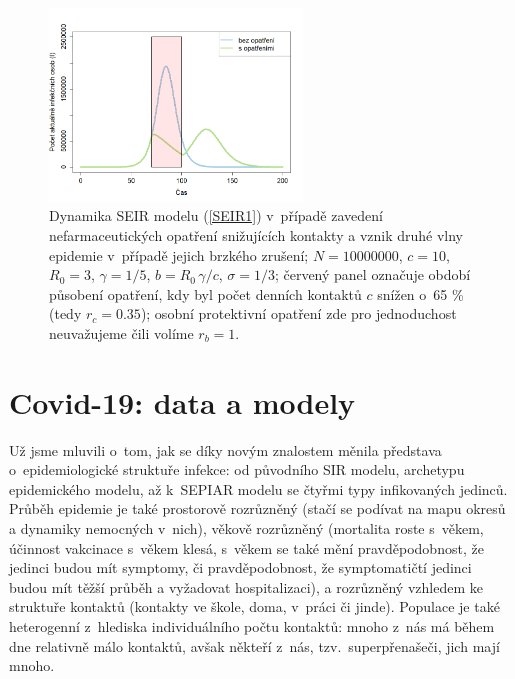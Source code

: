 \begin{figure}[ht]
	\begin{center}
			\includegraphics[width=0.6\textwidth]{pic/two_waves.png}
	\end{center}
	\caption{Dynamika SEIR modelu (\ref{SEIR1}) v~případě zavedení nefarmaceutických opatření snižujících kontakty a vznik druhé vlny epidemie v~případě jejich brzkého zrušení; $N=10000000$, $c=10$, $R_0=3$, $\gamma=1/5$, $b=R_0\,\gamma/c$, $\sigma=1/3$; červený panel označuje období působení opatření, kdy byl počet denních kontaktů $c$ snížen o~65 \% (tedy $r_c=0.35$); osobní protektivní opatření zde pro jednoduchost neuvažujeme čili volíme $r_b=1$. %
	}
	\label{SEIR-vlna}
\end{figure}

\section*{Covid-19: data a modely}

Už jsme mluvili o~tom, jak se díky novým znalostem měnila představa o~epidemiologické struktuře infekce: od původního SIR modelu, archetypu epidemického modelu, až k~SEPIAR modelu se čtyřmi typy infikovaných jedinců. Průběh epidemie je také prostorově rozrůzněný (stačí se podívat na mapu okresů a dynamiky nemocných v~nich), věkově rozrůzněný (mortalita roste s~věkem, účinnost vakcinace s~věkem klesá, s~věkem se také mění pravděpodobnost, že jedinci budou mít symptomy, či pravděpodobnost, že symptomatičtí jedinci budou mít těžší průběh a vyžadovat hospitalizaci), a rozrůzněný vzhledem ke struktuře kontaktů (kontakty ve škole, doma, v~práci či jinde). Populace je také heterogenní z~hlediska individuálního počtu kontaktů: mnoho z~nás má během dne relativně málo kontaktů, avšak někteří z~nás, tzv.\ superpřenašeči, jich mají mnoho. 


